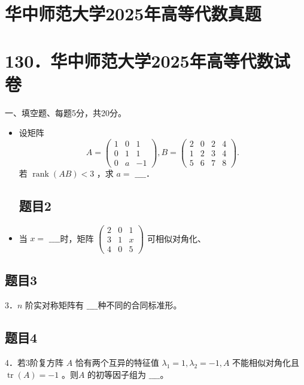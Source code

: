 \documentclass{article}
\begin{document}
\section*{华中师范大学2025年高等代数真题}
\section*{130．华中师范大学2025年高等代数试卷}
一、填空题、每题5分，共20分。

\begin{itemize}

\subsection{题目1}
  \item[1．] 设矩阵
\[
A=\left(\begin{array}{ccc}
1 & 0 & 1 \\
0 & 1 & 1 \\
0 & a & -1
\end{array}\right), B=\left(\begin{array}{llll}
2 & 0 & 2 & 4 \\
1 & 2 & 3 & 4 \\
5 & 6 & 7 & 8
\end{array}\right) .
\]
若 \(\operatorname{rank}(A B)<3\) ，求 \(a=\) \(\_\_\_\_\)．

\subsection{题目2}
  \item[2．] 当 \(x=\) \(\_\_\_\_\)时，矩阵 \(\left(\begin{array}{ccc}2 & 0 & 1 \\ 3 & 1 & x \\ 4 & 0 & 5\end{array}\right)\) 可相似对角化、
\end{itemize}

\subsection{题目3}
3．\(n\) 阶实对称矩阵有 \(\_\_\_\_\)种不同的合同标准形。

\subsection{题目4}
4．若3阶复方阵 \(A\) 恰有两个互异的特征值 \(\lambda_{1}=1, \lambda_{2}=-1, A\) 不能相似对角化且 \(\operatorname{tr}(A)=-1\) 。则\(A\) 的初等因子组为 \(\_\_\_\_\)。
\end{document}
